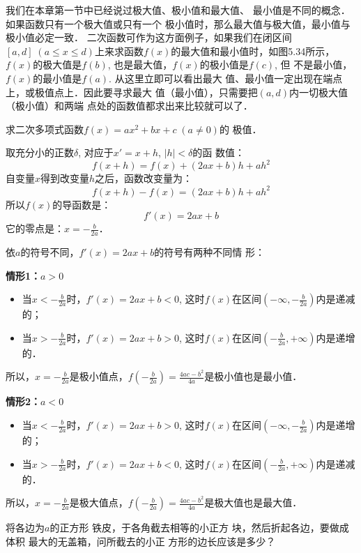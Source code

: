 我们在本章第一节中已经说过极大值、极小值和最大值、
最小值是不同的概念．如果函数只有一个极大值或只有一个
极小值时，那么最大值与极大值，最小值与极小值必定一致．
二次函数可作为这方面例子，如果我们在闭区间$[a,d]\; (a\le 
x\le d)$上来求函数$f(x)$的最大值和最小值时，如图5.34所示，
$f(x)$的极大值是$f(b)$, 也是最大值，$f(x)$的极小值是$f(c)$, 但
不是最小值，$f(x)$的最小值是$f(a)$. 从这里立即可以看出最大
值、最小值一定出现在端点上，或极值点上．因此要寻求最大
值（最小值），只需要把$(a,d)$内一切极大值（极小值）和两端
点处的函数值都求出来比较就可以了．

\begin{example}
    求二次多项式函数$f(x)=ax^2+bx+c\; (a\ne 0)$的
    极值．  
\end{example}

\begin{solution}
取充分小的正数$\delta$, 对应于$x'=x+h$, $|h|<\delta$的函
数值：
\[f(x+h)=f(x)+(2ax+b)h+ah^2\]
自变量$x$得到改变量$h$之后，函数改变量为：
\[f(x+h)-f(x)=(2ax+b)h+ah^2\]
所以$f(x)$的导函数是：
\[f'(x)=2ax+b\]
它的零点是：$x=-\frac{b}{2a}$．

依$a$的符号不同，$f'(x)=2ax+b$的符号有两种不同情
形：

\textbf{情形1：$a>0$}
\begin{itemize}
    \item 当$x<-\frac{b}{2a}$时，$f'(x)=2ax+b<0$, 这时$f(x)$在区间$\left(-\infty,-\frac{b}{2a}\right)$内是递减的；
    \item 当$x>-\frac{b}{2a}$时，$f'(x)=2ax+b>0$, 这时$f(x)$在区间$\left(-\frac{b}{2a},+\infty\right)$内是递增的．
\end{itemize}

所以，$x=-\frac{b}{2a}$是极小值点，$f\left(-\frac{b}{2a}\right)=\frac{4ac-b^2}{4a}$是极小值也是最小值．

\textbf{情形2：$a<0$}
\begin{itemize}
    \item 当$x<-\frac{b}{2a}$时，$f'(x)=2ax+b>0$, 这时$f(x)$在区间$\left(-\infty,-\frac{b}{2a}\right)$内是递增的；
    \item 当$x>-\frac{b}{2a}$时，$f'(x)=2ax+b<0$, 这时$f(x)$在区间$\left(-\frac{b}{2a},+\infty\right)$内是递减的．
\end{itemize}

所以，$x=-\frac{b}{2a}$是极大值点，$f\left(-\frac{b}{2a}\right)=\frac{4ac-b^2}{4a}$是极大值也是最大值．
\end{solution}


\begin{example}
将各边为$a$的正方形
铁皮，于各角截去相等的小正方
块，然后折起各边，要做成体积
最大的无盖箱，问所截去的小正
方形的边长应该是多少？
\end{example}

